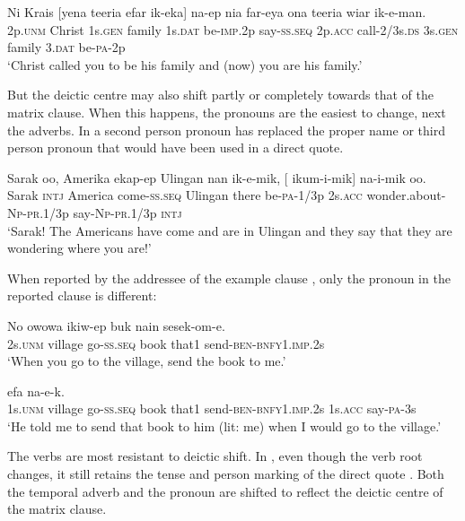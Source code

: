 \ea%
\label{ex:8:x1280}
\gll Ni  Krais  [yena  teeria  efar  ik-eka]  na-ep nia  far-eya  ona  teeria  wiar  ik-e-man.\\
2p.\textsc{unm} Christ 1s.\textsc{gen} family 1s.\textsc{dat} be-\textsc{imp}.2p say-\textsc{ss}.\textsc{seq} 2p.\textsc{acc} call-2/3s.\textsc{ds} 3s.\textsc{gen} family 3.\textsc{dat} be-\textsc{pa}-2p\\
\glt`Christ called you to be his family and (now) you are his family.'
\z


But the deictic centre may also shift partly or completely towards that of the matrix clause. When this happens, the pronouns are the easiest to change, next the adverbs. In  a second person pronoun has replaced the proper name or third person pronoun that would have been used in a direct quote.

\ea%
\label{ex:8:x1586}
\gll Sarak  oo,  Amerika  ekap-ep  Ulingan  nan  ik-e-mik, [  ikum-i-mik]  na-i-mik  oo. \\
Sarak \textsc{intj} America come-\textsc{ss}.\textsc{seq} Ulingan  there be-\textsc{pa}-1/3p 2s.\textsc{acc} wonder.about-\textsc{Np}-\textsc{pr}.1/3p say-\textsc{Np}-\textsc{pr}.1/3p \textsc{intj}\\
\glt`Sarak! The Americans have come and are in Ulingan and they say that they are wondering where you are!'
\z


When reported by the addressee of the example clause , only the pronoun in the reported clause  is different:

\ea%
\label{ex:8:x1281}
\gll No  owowa  ikiw-ep  buk  nain  sesek-om-e.\\
2s.\textsc{unm} village  go-\textsc{ss}.\textsc{seq} book that1  send-\textsc{ben}-\textsc{bnfy}1.\textsc{imp}.2s\\
\glt`When you go to the village, send the book to me.'
\z


\ea%
\label{ex:8:x1282}
 efa  na-e-k. \\
1s.\textsc{unm} village go-\textsc{ss}.\textsc{seq} book that1 send-\textsc{ben}-\textsc{bnfy}1.\textsc{imp}.2s 1s.\textsc{acc} say-\textsc{pa}-3s\\
\glt`He told me to send that book to him (lit: me) when I would go to the village.'
\z


The verbs are most resistant to deictic shift. In , even though the verb root changes, it still retains the tense and person marking of the direct quote . Both the temporal adverb and the pronoun are shifted to reflect the deictic centre of the matrix clause.

